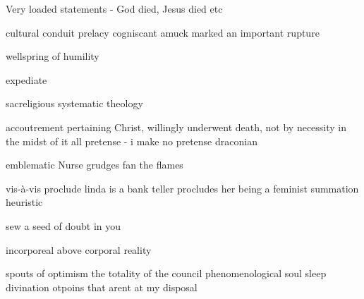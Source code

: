 Very loaded statements - God died, Jesus died etc


cultural conduit
prelacy
cogniscant
amuck
marked an important rupture

wellspring of humility

expediate

sacreligious
systematic theology


accoutrement
pertaining
Christ, willingly underwent death, not by necessity
in the midst of it all
pretense - i make no pretense
draconian

emblematic
Nurse grudges
fan the flames

vis-à-vis
proclude
linda is a bank teller procludes her being a feminist
summation
heuristic

sew a seed of doubt in you

incorporeal above corporal reality

spouts of optimism
the totality of the council
phenomenological
soul sleep
divination
otpoins that arent at my disposal

